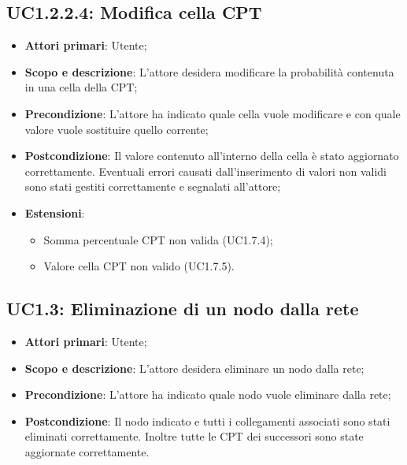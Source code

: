 \subsection{UC1.2.2.4: Modifica cella CPT} 
\hypertarget{UC1.2.2.4}{} 
\begin{itemize} 
	\item{\textbf{Attori primari}: Utente;} 
	\item{\textbf{Scopo e descrizione}: L'attore desidera modificare la probabilità contenuta in una cella della CPT;} 
	\item{\textbf{Precondizione}: L'attore ha indicato quale cella vuole modificare e con quale valore vuole sostituire quello corrente;} 
	\item{\textbf{Postcondizione}: Il valore contenuto all'interno della cella è stato aggiornato correttamente. Eventuali errori causati dall'inserimento di valori non validi sono stati gestiti correttamente e segnalati all'attore;}
	\item{\textbf{Estensioni}:
		\begin{itemize}
			\item{Somma percentuale CPT non valida (UC1.7.4);}
			\item{Valore cella CPT non valido (UC1.7.5).}
		\end{itemize}
	}
\end{itemize} 
\subsection{UC1.3: Eliminazione di un nodo dalla rete} 
\hypertarget{UC1.3}{} 
\begin{itemize} 
	\item{\textbf{Attori primari}: Utente;} 
	\item{\textbf{Scopo e descrizione}: L'attore desidera eliminare un nodo dalla rete;} 
	\item{\textbf{Precondizione}:
		 L'attore ha indicato quale nodo vuole eliminare dalla rete;} 
	\item{\textbf{Postcondizione}: Il nodo indicato e tutti i collegamenti associati sono stati eliminati correttamente. Inoltre tutte le CPT dei successori sono state aggiornate correttamente.} 
\end{itemize} 
